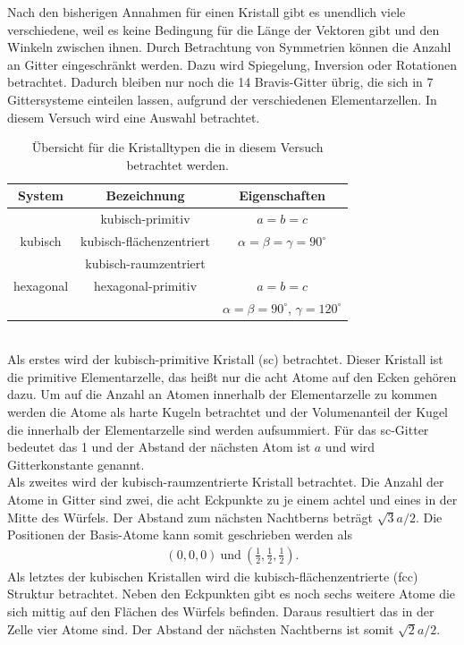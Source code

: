Nach den bisherigen Annahmen für einen Kristall gibt es unendlich viele verschiedene, weil es keine Bedingung für die Länge der Vektoren gibt und den Winkeln zwischen ihnen. Durch Betrachtung von Symmetrien können die Anzahl an Gitter eingeschränkt werden. Dazu wird Spiegelung, Inversion oder Rotationen betrachtet. Dadurch bleiben nur noch die 14 Bravis-Gitter übrig, die sich in 7 Gittersysteme einteilen lassen, aufgrund der verschiedenen Elementarzellen.
In diesem Versuch wird eine Auswahl betrachtet.\\
\begin{table}[h!]
	\centering
	\begin{tabular}{c|c|c}
		System 	& Bezeichnung 				& Eigenschaften\\\hline
				& kubisch-primitiv			& $a=b=c$\\
		kubisch & kubisch-flächenzentriert	& $\alpha=\beta=\gamma=90^\circ$\\
				& kubisch-raumzentriert		&\\\hline
		hexagonal& hexagonal-primitiv		&$a=b=c$\\
				&							&$\alpha = \beta =90^\circ$, $ \gamma=120^\circ$
	\end{tabular}
	\caption{Übersicht für die Kristalltypen die in diesem Versuch betrachtet werden\cite{V41}.}
	\label{tab:Kristalltypen}
\end{table}\\
Als erstes wird der kubisch-primitive Kristall (sc) betrachtet. Dieser Kristall ist die primitive Elementarzelle, das heißt nur die acht Atome auf den Ecken gehören dazu. Um auf die Anzahl an Atomen innerhalb der Elementarzelle zu kommen werden die Atome als harte Kugeln betrachtet und der Volumenanteil der Kugel die innerhalb der Elementarzelle sind werden aufsummiert. Für das sc-Gitter bedeutet das 1 und der Abstand der nächsten Atom ist $a$ und wird Gitterkonstante genannt.\\
Als zweites wird der kubisch-raumzentrierte Kristall betrachtet. Die Anzahl der Atome in Gitter sind zwei, die acht Eckpunkte zu je einem achtel und eines in der Mitte des Würfels. Der Abstand zum nächsten Nachtberns beträgt $\sqrt{3}a/2$. Die Positionen der Basis-Atome kann somit geschrieben werden als
\begin{align}
	\left (0 , 0 , 0 \right)\ \text{und}\ \left(\frac{1}{2},\frac{1}{2},\frac{1}{2}\right).
\end{align}
Als letztes der kubischen Kristallen wird die kubisch-flächenzentrierte (fcc) Struktur betrachtet.
Neben den Eckpunkten gibt es noch sechs weitere Atome die sich mittig auf den Flächen des Würfels befinden. Daraus resultiert das in der Zelle vier Atome sind. Der Abstand der nächsten Nachtberns ist somit $\sqrt{2}a/2$.

